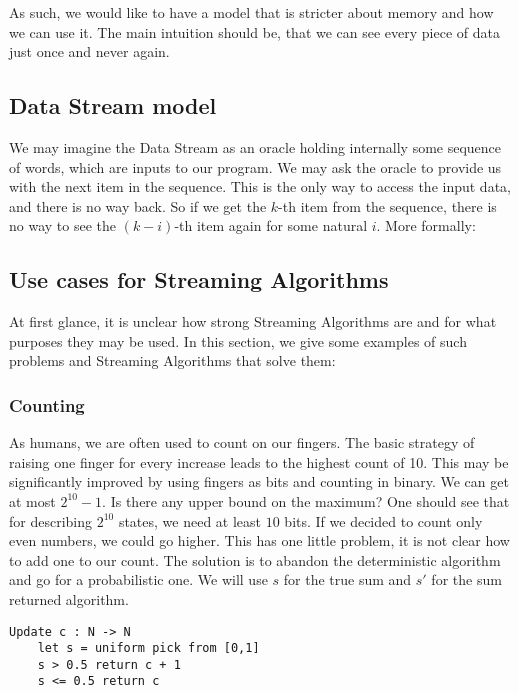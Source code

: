As such, we would like to have a model that is stricter about memory and how we can use it. The main intuition should be, that we can see every piece of data just once and never again.

\subsection{Data Stream model}

We may imagine the Data Stream as an oracle holding internally some sequence of words, which are inputs to our program. We may ask the oracle to provide us with the next item in the sequence. This is the only way to access the input data, and there is no way back. So if we get the \(k\)-th item from the sequence, there is no way to see the \((k-i)\)-th item again for some natural \(i\). More formally:

\subsection{Use cases for Streaming Algorithms}

At first glance, it is unclear how strong Streaming Algorithms are and for what purposes they may be used. In this section, we give some examples of such problems and Streaming Algorithms that solve them: 

\subsubsection{Counting}
As humans, we are often used to count on our fingers. The basic strategy of raising one finger for every increase leads to the highest count of 10. This may be significantly improved by using fingers as bits and counting in binary. We can get at most $2^{10} - 1$. Is there any upper bound on the maximum?
One should see that for describing $2^{10}$ states, we need at least $10$ bits.
If we decided to count only even numbers, we could go higher. This has one little problem, it is not clear how to add one to our count. The solution is to abandon the deterministic algorithm and go for a probabilistic one.  We will use $s$ for the true sum and $s'$ for the sum returned algorithm. 

\begin{lstlisting}
Update c : N -> N
    let s = uniform pick from [0,1]
    s > 0.5 return c + 1
    s <= 0.5 return c
\end{lstlisting}

